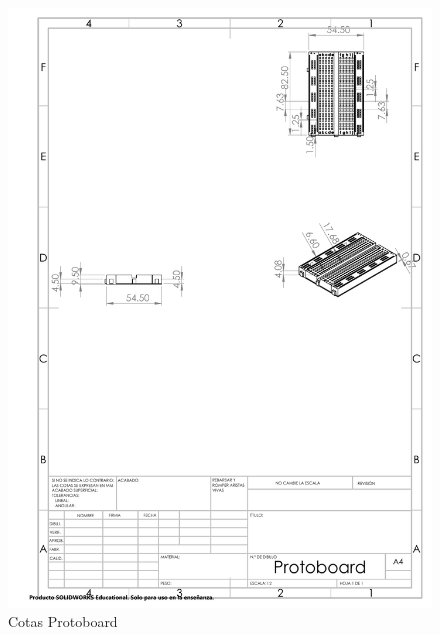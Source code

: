 \begin{figure}[H]
        \centering
        \includegraphics[trim = {0mm 0mm 0mm 0mm},clip,scale=0.2]{10/Img/cotasProtoboard.pdf}
        \caption{Cotas Protoboard}
        \label{Plano Protoboard}
    \end{figure}


